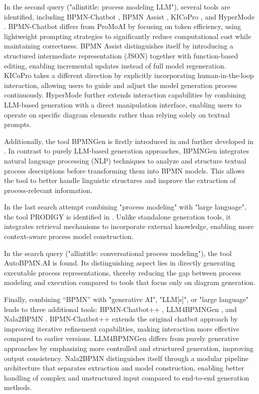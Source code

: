 In the second query ("allintitle: process modeling LLM"), several tools are identified, including BPMN-Chatbot \cite{kopke2024introducing}, BPMN Assist \cite{licardo2026bpmn}, KICoPro \cite{lauer2026human}, and HyperMode \cite{pardo2025direct}. BPMN-Chatbot differs from ProMoAI by focusing on token efficiency, using lightweight prompting strategies to significantly reduce computational cost while maintaining correctness. BPMN Assist distinguishes itself by introducing a structured intermediate representation (JSON) together with function-based editing, enabling incremental updates instead of full model regeneration. KICoPro takes a different direction by explicitly incorporating human-in-the-loop interaction, allowing users to guide and adjust the model generation process continuously. HyperMode further extends interaction capabilities by combining LLM-based generation with a direct manipulation interface, enabling users to operate on specific diagram elements rather than relying solely on textual prompts.  

Additionally, the tool BPMNGen is firstly introduced in \cite{horner2025towards} and further developed in \cite{horner2026automatically}. In contrast to purely LLM-based generation approaches, BPMNGen integrates natural language processing (NLP) techniques to analyze and structure textual process descriptions before transforming them into BPMN models. This allows the tool to better handle linguistic structures and improve the extraction of process-relevant information.

In the last search attempt combining "process modeling" with "large language", the tool PRODIGY is identified in \cite{ziche2024llm4pm}. Unlike standalone generation tools, it integrates retrieval mechanisms to incorporate external knowledge, enabling more context-aware process model construction.

In the search query ("allintitle: conversational process modeling"), the tool AutoBPMN.AI \cite{klievtsova2025autobpmn} is found. Its distinguishing aspect lies in directly generating executable process representations, thereby reducing the gap between process modeling and execution compared to tools that focus only on diagram generation.

Finally, combining “BPMN” with "generative AI", "LLM[s]", or "large language" leads to three additional tools: BPMN-Chatbot++ \cite{safan2025bpmn}, LLM4BPMNGen \cite{costa2025llm4bpmngen}, and Nala2BPMN \cite{nour2024nala2bpmn}. BPMN-Chatbot++ extends the original chatbot approach by improving iterative refinement capabilities, making interaction more effective compared to earlier versions. LLM4BPMNGen differs from purely generative approaches by emphasizing more controlled and structured generation, improving output consistency. Nala2BPMN distinguishes itself through a modular pipeline architecture that separates extraction and model construction, enabling better handling of complex and unstructured input compared to end-to-end generation methods.

